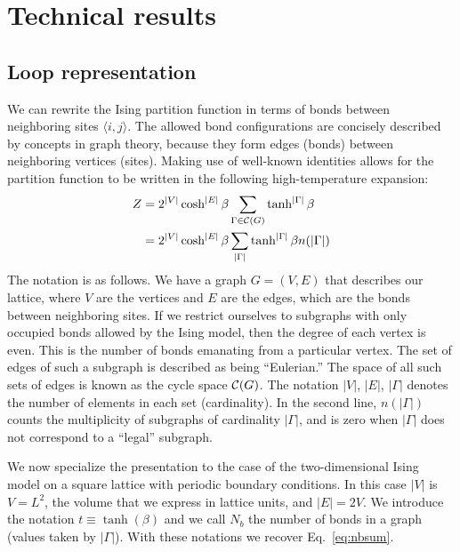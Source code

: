 \documentclass[../main.tex]{subfiles}
\begin{document}
\section{Technical results}%
\label{sec:technical_results}
\subsection{Loop representation}%
\label{ssec:loop_representation}
We can rewrite the Ising partition function in terms of bonds between neighboring sites $\langle i , j \rangle$. The
allowed bond configurations are concisely described by concepts in graph theory, because they form edges (bonds)
between neighboring vertices (sites). Making use of well-known identities allows for the partition function to be
written in the following high-temperature expansion:
%
\begin{align}
    Z &= 2^{|V|} \cosh^{|E|} \beta \sum_{\Gamma \in {\cal C}(G)}
    \tanh^{|\Gamma|} \beta \\
    &= 2^{|V|} \cosh^{|E|} \beta \sum_{|\Gamma|} \tanh^{|\Gamma|} \beta
    n(|\Gamma|)
\label{eq:z}
\end{align}
%
The notation is as follows. We have a graph $G=(V,E)$ that describes our
lattice, where $V$ are the vertices and $E$ are the edges, which are the bonds
between neighboring sites. If we restrict ourselves to subgraphs with only
occupied bonds allowed by the Ising model, then the degree of each vertex is
even.  This is the number of bonds emanating from a particular vertex. The set
of edges of such a subgraph is described as being ``Eulerian.''  The space of
all such sets of edges is known as the cycle space ${\cal C}(G)$. The notation
$|V|$, $|E|$, $|\Gamma|$ denotes the number of elements in each set
(cardinality).  In the second line, $n(|\Gamma|)$ counts the multiplicity of
subgraphs of cardinality $|\Gamma|$, and is zero when $|\Gamma|$ does not
correspond to a ``legal'' subgraph.

We now specialize the presentation to the case of the two-dimensional Ising
model on a square lattice with periodic boundary conditions. In this case $|V|$
is $V=L^2$, the volume that we express in lattice units, and $|E| = 2V$. We
introduce the notation $t\equiv\tanh(\beta)$ and we call $N_b$ the number of
bonds in a graph (values taken by $|\Gamma|$). With these notations we recover
Eq.~\ref{eq:nbsum}.
\end{document}
